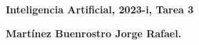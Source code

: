 \documentclass[12pt,twoside]{article}
\date{}
\begin{document}
    \centerline{\bf Inteligencia Artificial, 2023-i, Tarea 3}
    \centerline{}
    \centerline{\bf {Martínez Buenrostro Jorge Rafael.}}
    
    \newpage
    
    \newpage
    

    
\end{document}
